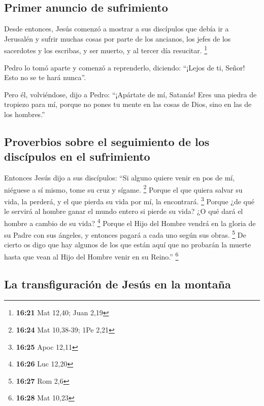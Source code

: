 \hypertarget{primer-anuncio-de-sufrimiento}{%
\subsection{Primer anuncio de
sufrimiento}\label{primer-anuncio-de-sufrimiento}}

 Desde entonces, Jesús comenzó a mostrar a sus discípulos
que debía ir a Jerusalén y sufrir muchas cosas por parte de los
ancianos, los jefes de los sacerdotes y los escribas, y ser muerto, y al
tercer día resucitar. \footnote{\textbf{16:21} Mat 12,40; Juan 2,19}

 Pedro lo tomó aparte y comenzó a reprenderlo, diciendo:
``¡Lejos de ti, Señor! Esto no se te hará nunca''.

 Pero él, volviéndose, dijo a Pedro: ``¡Apártate de mí,
Satanás! Eres una piedra de tropiezo para mí, porque no pones tu mente
en las cosas de Dios, sino en las de los hombres.''

\hypertarget{proverbios-sobre-el-seguimiento-de-los-discuxedpulos-en-el-sufrimiento}{%
\subsection{Proverbios sobre el seguimiento de los discípulos en el
sufrimiento}\label{proverbios-sobre-el-seguimiento-de-los-discuxedpulos-en-el-sufrimiento}}

 Entonces Jesús dijo a sus discípulos: ``Si alguno quiere
venir en pos de mí, niéguese a sí mismo, tome su cruz y sígame.
\footnote{\textbf{16:24} Mat 10,38-39; 1Pe 2,21}  Porque
el que quiera salvar su vida, la perderá, y el que pierda su vida por
mí, la encontrará. \footnote{\textbf{16:25} Apoc 12,11} 
Porque ¿de qué le servirá al hombre ganar el mundo entero si pierde su
vida? ¿O qué dará el hombre a cambio de su vida? \footnote{\textbf{16:26}
  Luc 12,20}  Porque el Hijo del Hombre vendrá en la
gloria de su Padre con sus ángeles, y entonces pagará a cada uno según
sus obras. \footnote{\textbf{16:27} Rom 2,6}  De cierto
os digo que hay algunos de los que están aquí que no probarán la muerte
hasta que vean al Hijo del Hombre venir en su Reino.'' \footnote{\textbf{16:28}
  Mat 10,23}

\hypertarget{la-transfiguraciuxf3n-de-jesuxfas-en-la-montauxf1a}{%
\subsection{La transfiguración de Jesús en la
montaña}\label{la-transfiguraciuxf3n-de-jesuxfas-en-la-montauxf1a}}

